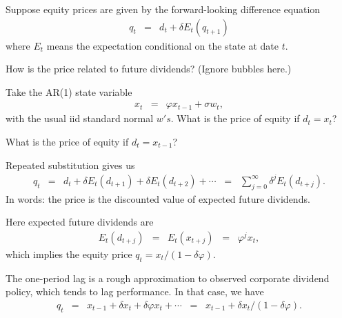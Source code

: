\documentclass[11pt]{exam}
\begin{document}
\begin{questions}
\begin{solution}
\begin{parts}
\end{parts}
\end{solution}

Suppose equity prices are given by the forward-looking difference equation
\begin{eqnarray*}
    q_{t}   &=&  d_t + \delta E_t (q_{t+1})
\end{eqnarray*}
where $E_t$ means the expectation conditional on the state at date $t$.
%
\begin{parts}
\item How is the price related to future dividends?
(Ignore bubbles here.)
\item Take the AR(1) state variable
\begin{eqnarray*}
    x_t &=& \varphi x_{t-1} + \sigma w_t ,
\end{eqnarray*}
with the usual iid standard normal $w's$.
What is the price of equity if $d_t = x_t$?

\item What is the price of equity if $d_t = x_{t-1}$?
\end{parts}

\begin{solution}
\begin{parts}
\item Repeated substitution gives us 
\begin{eqnarray*}
    q_{t}   &=&  d_t + \delta E_t (d_{t+1}) + \delta E_t (d_{t+2}) + \cdots 
            \;\;=\;\; \sum_{j=0}^\infty \delta^j E_t (d_{t+j}) .
\end{eqnarray*}
In words:  the price is the discounted value of expected future dividends.  

\item Here expected future dividends are 
\begin{eqnarray*} 
    E_t (d_{t+j}) &=& E_t (x_{t+j}) \;\;=\;\; \varphi^j x_t , 
\end{eqnarray*} 
which implies the equity price $q_t = x_t /(1-\delta \varphi) $.

\item The one-period lag is a rough approximation to observed corporate dividend policy, 
which tends to lag performance.  
In that case, we have 
\begin{eqnarray*}
    q_t  &=& x_{t-1} + \delta x_t + \delta \varphi x_t + \cdots 
            \;\;=\;\; x_{t-1} + \delta x_t /(1-\delta \varphi) .
\end{eqnarray*}


\end{parts}
\end{solution}
\end{questions}
\end{document}
